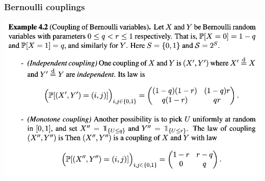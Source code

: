 \documentclass[mathserif,compress,xcolor={dvipsnames}]{beamer}
\renewcommand\;{\,}
\begin{document}
\begin{frame}\frametitle{Bernoulli couplings}
\begin{center}
\includegraphics[width=\linewidth]{Figures/Bernoulli.png}
\end{center}

\end{frame}
\end{document}
